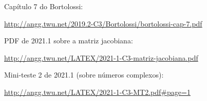 \documentclass[oneside,12pt]{article}
\begin{document}
\ssk

Capítulo 7 do Bortolossi:

{\footnotesize

\url{http://angg.twu.net/2019.2-C3/Bortolossi/bortolossi-cap-7.pdf}

}

\msk

PDF de 2021.1 sobre a matriz jacobiana:

{\footnotesize

\url{http://angg.twu.net/LATEX/2021-1-C3-matriz-jacobiana.pdf}

}

\msk

Mini-teste 2 de 2021.1 (sobre números complexos):

{\footnotesize

\url{http://angg.twu.net/LATEX/2021-1-C3-MT2.pdf#page=1}

}




\end{document}

